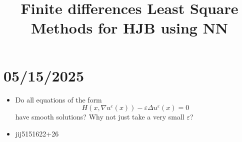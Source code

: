 \documentclass[12pt]{article}
\date{}
\begin{document}
	\title{Finite differences Least Square Methods for HJB using NN} %
	\maketitle
	\section*{05/15/2025}
	\begin{itemize}
		\item Do all equations of the form $$H(x,\nabla u^{\varepsilon}(x))-\varepsilon\Delta u^{\varepsilon}(x)=0$$ have smooth solutions? Why not just take a very small $\varepsilon$?
		\item jij5151622+26
	\end{itemize}
\end{document}
